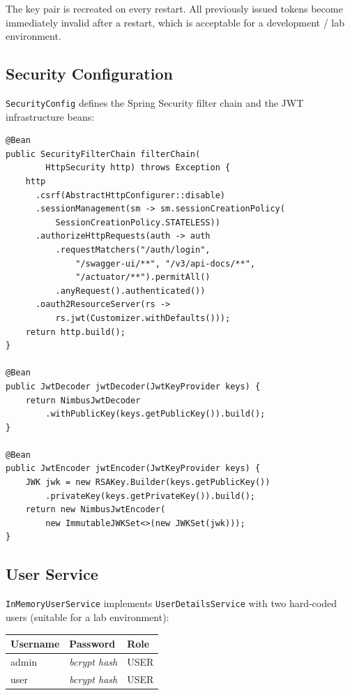\documentclass[10pt,a4paper,twocolumn]{article}
\begin{document}
\begin{note}
The key pair is recreated on every restart. All previously issued tokens
become immediately invalid after a restart, which is acceptable for a
development / lab environment.
\end{note}

\subsection{Security Configuration}

\texttt{SecurityConfig} defines the Spring Security filter chain and the
JWT infrastructure beans:

\begin{lstlisting}[style=javacode, caption={SecurityConfig (simplified)}]
@Bean
public SecurityFilterChain filterChain(
        HttpSecurity http) throws Exception {
    http
      .csrf(AbstractHttpConfigurer::disable)
      .sessionManagement(sm -> sm.sessionCreationPolicy(
          SessionCreationPolicy.STATELESS))
      .authorizeHttpRequests(auth -> auth
          .requestMatchers("/auth/login",
              "/swagger-ui/**", "/v3/api-docs/**",
              "/actuator/**").permitAll()
          .anyRequest().authenticated())
      .oauth2ResourceServer(rs ->
          rs.jwt(Customizer.withDefaults()));
    return http.build();
}

@Bean
public JwtDecoder jwtDecoder(JwtKeyProvider keys) {
    return NimbusJwtDecoder
        .withPublicKey(keys.getPublicKey()).build();
}

@Bean
public JwtEncoder jwtEncoder(JwtKeyProvider keys) {
    JWK jwk = new RSAKey.Builder(keys.getPublicKey())
        .privateKey(keys.getPrivateKey()).build();
    return new NimbusJwtEncoder(
        new ImmutableJWKSet<>(new JWKSet(jwk)));
}
\end{lstlisting}

\subsection{User Service}

\texttt{InMemoryUserService} implements \texttt{UserDetailsService} with two
hard-coded users (suitable for a lab environment):

\begin{center}
\small
\begin{tabular}{@{}lll@{}}
\toprule
\textbf{Username} & \textbf{Password} & \textbf{Role} \\
\midrule
admin & \textit{bcrypt hash} & USER \\
user  & \textit{bcrypt hash} & USER \\
\bottomrule
\end{tabular}
\end{center}
\end{document}
